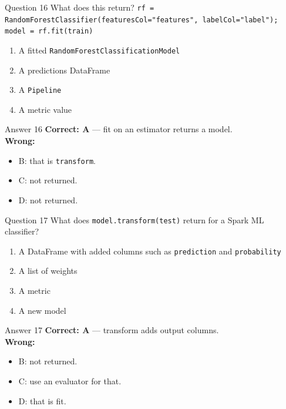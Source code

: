 \documentclass[aspectratio=169,11pt]{beamer}
\begin{document}
\begin{frame}{Question 16}
What does this return?  \texttt{rf = RandomForestClassifier(featuresCol="features", labelCol="label"); model = rf.fit(train)}
\begin{enumerate}[label=\Alph*.]
\item A fitted \texttt{RandomForestClassificationModel}
\item A predictions DataFrame
\item A \texttt{Pipeline}
\item A metric value
\end{enumerate}
\end{frame}
\begin{frame}{Answer 16}
\textbf{Correct: A} --- fit on an estimator returns a model.\\
\vspace{0.5em}
\textbf{Wrong:}
\begin{itemize}
\item B: that is \texttt{transform}.
\item C: not returned.
\item D: not returned.
\end{itemize}
\end{frame}

\begin{frame}{Question 17}
What does \texttt{model.transform(test)} return for a Spark ML classifier?
\begin{enumerate}[label=\Alph*.]
\item A DataFrame with added columns such as \texttt{prediction} and \texttt{probability}
\item A list of weights
\item A metric
\item A new model
\end{enumerate}
\end{frame}
\begin{frame}{Answer 17}
\textbf{Correct: A} --- transform adds output columns.\\
\vspace{0.5em}
\textbf{Wrong:}
\begin{itemize}
\item B: not returned.
\item C: use an evaluator for that.
\item D: that is fit.
\end{itemize}
\end{frame}
\end{document}
